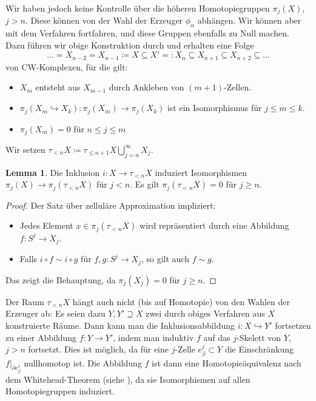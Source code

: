 \documentclass[11pt, a4paper, german]{article}
\theoremstyle{definition}
\newtheorem{lem}{Lemma}
\theoremstyle{remark}
\newcommand{\trunc}[2]{\tau_{#1} #2} %
\begin{document}
Wir haben jedoch keine Kontrolle über die höheren Homotopiegruppen $\pi_j(X)$, $j > n$.
Diese können von der Wahl der Erzeuger $\phi_\alpha$ abhängen.
Wir können aber mit dem Verfahren fortfahren, und diese Gruppen ebenfalls zu Null machen.
Dazu führen wir obige Konstruktion durch und erhalten eine Folge
\[ \ldots = X_{n-2} = X_{n-1} \coloneqq X \subseteq X' =: X_n \subseteq X_{n+1} \subseteq X_{n+2} \subseteq \ldots \]
von CW-Komplexen, für die gilt:
\begin{itemize}
  \item $X_m$ entsteht aus $X_{m-1}$ durch Ankleben von $(m{+}1)$-Zellen.
  \item $\pi_j(X_m \hookrightarrow X_k) : \pi_j(X_m) \to \pi_j(X_k)$ ist ein Isomorphismus für $j \leq m \leq k$.
  \item $\pi_j(X_m) = 0$ für $n \leq j \leq m$
\end{itemize}
Wir setzen $\trunc{< n}{X} \coloneqq \trunc{\leq n+1}{X} \bigcup_{j=n}^\infty X_j$.

\begin{lem}
  Die Inklusion $i : X \to \trunc{< n}{X}$ induziert Isomorphismen $\pi_j(X) \to \pi_j(\trunc{< n}{X})$ für $j < n$.
  Es gilt $\pi_j(\trunc{< n}{X}) = 0$ für $j \geq n$.
\end{lem}

\begin{proof}
  Der Satz über zelluläre Approximation impliziert:
  \begin{itemize}
    \item Jedes Element $x \in \pi_j(\trunc{< n}{X})$ wird repräsentiert durch eine Abbildung $f : S^j \to X_j$.
    \item Falls $i \circ f \sim i \circ g$ für $f, g : S^j \to X_j$, so gilt auch $f \sim g$.
  \end{itemize}
  Das zeigt die Behauptung, da $\pi_j(X_j) = 0$ für $j \geq n$.
\end{proof}

Der Raum $\trunc{< n}{X}$ hängt auch nicht (bis auf Homotopie) von den Wahlen der Erzeuger ab:
Es seien dazu $Y, Y' \supseteq X$ zwei durch obiges Verfahren aus $X$ konstruierte Räume.
Dann kann man die Inklusionsabbildung $i : X \hookrightarrow Y'$ fortsetzen zu einer Abbildung $f : Y \to Y'$, indem man induktiv $f$ auf das $j$-Skelett von $Y$, $j > n$ fortsetzt.
Dies ist möglich, da für eine $j$-Zelle $e_\beta^j \subset Y$ die Einschränkung $f|_{\partial e_\beta^j}$ nullhomotop ist.
Die Abbildung $f$ ist dann eine Homotopieäquivalenz nach dem Whitehead-Theorem (siehe \cite[Thm 4.5]{hatcher:at}), da sie Isomorphismen auf allen Homotopiegruppen induziert.
\end{document}
